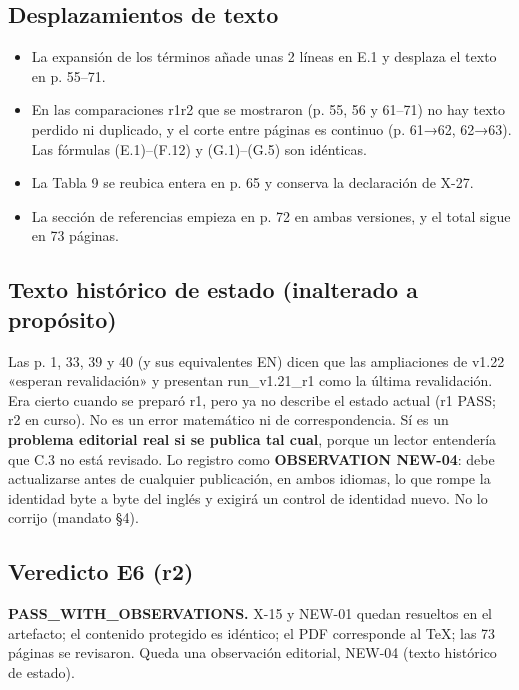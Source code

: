\documentclass[
]{article}
\providecommand{\tightlist}{%
  \setlength{\itemsep}{0pt}\setlength{\parskip}{0pt}}
\begin{document}
\subsection{Desplazamientos de texto}\label{desplazamientos-de-texto}

\begin{itemize}
\tightlist
\item
  La expansión de los términos añade unas 2 líneas en E.1 y desplaza el
  texto en p. 55--71.
\item
  En las comparaciones r1\textbar r2 que se mostraron (p. 55, 56 y
  61--71) no hay texto perdido ni duplicado, y el corte entre páginas es
  continuo (p. 61→62, 62→63). Las fórmulas (E.1)--(F.12) y (G.1)--(G.5)
  son idénticas.
\item
  La Tabla 9 se reubica entera en p. 65 y conserva la declaración de
  X-27.
\item
  La sección de referencias empieza en p. 72 en ambas versiones, y el
  total sigue en 73 páginas.
\end{itemize}

\subsection{Texto histórico de estado (inalterado a
propósito)}\label{texto-histuxf3rico-de-estado-inalterado-a-propuxf3sito}

Las p. 1, 33, 39 y 40 (y sus equivalentes EN) dicen que las ampliaciones
de v1.22 «esperan revalidación» y presentan run\_v1.21\_r1 como la
última revalidación. Era cierto cuando se preparó r1, pero ya no
describe el estado actual (r1 PASS; r2 en curso). No es un error
matemático ni de correspondencia. Sí es un \textbf{problema editorial
real si se publica tal cual}, porque un lector entendería que C.3 no
está revisado. Lo registro como \textbf{OBSERVATION NEW-04}: debe
actualizarse antes de cualquier publicación, en ambos idiomas, lo que
rompe la identidad byte a byte del inglés y exigirá un control de
identidad nuevo. No lo corrijo (mandato §4).

\subsection{Veredicto E6 (r2)}\label{veredicto-e6-r2}

\textbf{PASS\_WITH\_OBSERVATIONS.} X-15 y NEW-01 quedan resueltos en el
artefacto; el contenido protegido es idéntico; el PDF corresponde al
TeX; las 73 páginas se revisaron. Queda una observación editorial,
NEW-04 (texto histórico de estado).
\end{document}
